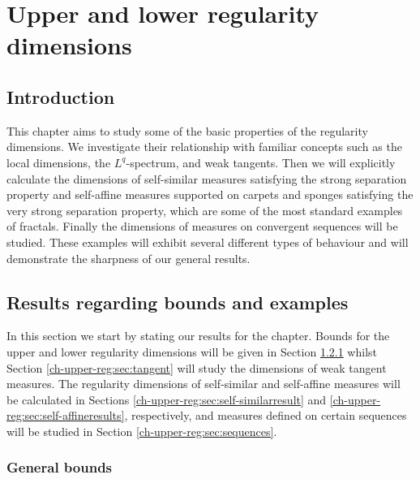 \chapter{Upper and lower regularity dimensions}
\label{chap:upper_reg}


\section{Introduction}
\label{ch-upper-reg:intro-reg-dims}


This chapter aims to study some of the basic properties of the regularity dimensions. We investigate their relationship with familiar concepts such as the local dimensions, the $L^q$-spectrum, and weak tangents. Then we will explicitly calculate the dimensions of self-similar measures satisfying the strong separation property and self-affine measures supported on carpets and sponges satisfying the very strong separation property, which are some of the most standard examples of fractals. Finally the dimensions of measures on convergent sequences will be studied. These examples will exhibit several different types of behaviour and will demonstrate the sharpness of our general results. 


\section{Results regarding bounds and examples}\label{ch-upper-reg:results}

In this section we start by stating our results for the chapter. Bounds for the upper and lower regularity dimensions will be given in Section \ref{ch-upper-reg:bounds} whilst Section \ref{ch-upper-reg:sec:tangent} will study the dimensions of weak tangent measures. The regularity dimensions of self-similar and self-affine measures will be calculated in Sections \ref{ch-upper-reg:sec:self-similarresult} and \ref{ch-upper-reg:sec:self-affineresults}, respectively, and measures defined on certain sequences will be studied in Section \ref{ch-upper-reg:sec:sequences}. 

\subsection{General bounds}\label{ch-upper-reg:bounds}

